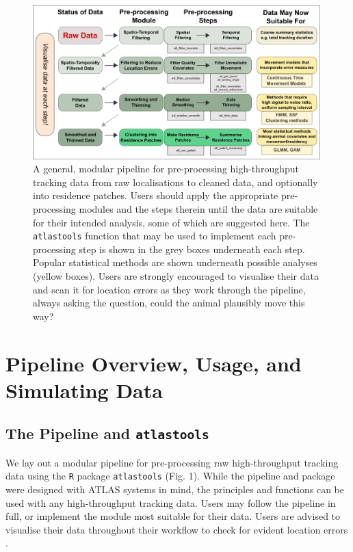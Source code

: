 \documentclass[10pt,paper=a4,headings=standardclasses
]{scrartcl}
\begin{document}
\begin{figure}
    \centering
    \includegraphics[width=0.99\textwidth]{figures/fig_01_recipe.png}
    \caption{A general, modular pipeline for pre-processing high-throughput tracking data from raw localisations to cleaned data, and optionally into residence patches. 
    Users should apply the appropriate pre-processing modules and the steps therein until the data are suitable for their intended analysis, some of which are suggested here.
    The \texttt{atlastools} function that may be used to implement each pre-processing step is shown in the grey boxes underneath each step.
    Popular statistical methods are shown underneath possible analyses (yellow boxes).
    Users are strongly encouraged to visualise their data and scan it for location errors as they work through the pipeline, always asking the question, could the animal plausibly move this way?
    }
    \label{fig:figure_pipeline}
\end{figure}

\section{Pipeline Overview, Usage, and Simulating Data}

\subsection{The Pipeline and \texttt{atlastools}}

We lay out a modular pipeline for pre-processing raw high-throughput tracking data using the \texttt{R} package \texttt{atlastools} (Fig. 1).
While the pipeline and package were designed with ATLAS systems in mind, the principles and functions can be used with any high-throughput tracking data.
Users may follow the pipeline in full, or implement the module most suitable for their data.
Users are advised to visualise their data throughout their workflow to check for evident location errors \citep{slingsby2016}.
\end{document}
